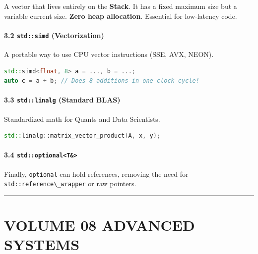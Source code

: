 A vector that lives entirely on the \textbf{Stack}. It has a fixed
maximum size but a variable current size. \textbf{Zero heap allocation}.
Essential for low-latency code.

\hypertarget{stdsimd-vectorization}{%
\paragraph{\texorpdfstring{3.2 \texttt{std::simd}
(Vectorization)}{3.2 std::simd (Vectorization)}}\label{stdsimd-vectorization}}

A portable way to use CPU vector instructions (SSE, AVX, NEON).

\begin{lstlisting}[language={C++}]
std::simd<float, 8> a = ..., b = ...;
auto c = a + b; // Does 8 additions in one clock cycle!
\end{lstlisting}

\hypertarget{stdlinalg-standard-blas}{%
\paragraph{\texorpdfstring{3.3 \texttt{std::linalg} (Standard
BLAS)}{3.3 std::linalg (Standard BLAS)}}\label{stdlinalg-standard-blas}}

Standardized math for Quants and Data Scientists.

\begin{lstlisting}[language={C++}]
std::linalg::matrix_vector_product(A, x, y);
\end{lstlisting}

\hypertarget{stdoptionalt}{%
\paragraph{\texorpdfstring{3.4
\texttt{std::optional\textless{}T\&\textgreater{}}}{3.4 std::optional\textless T\&\textgreater{}}}\label{stdoptionalt}}

Finally, \passthrough{\lstinline!optional!} can hold references,
removing the need for \passthrough{\lstinline!std::reference\_wrapper!}
or raw pointers.

\begin{center}\rule{0.5\linewidth}{0.5pt}\end{center}

\hypertarget{volume-08-advanced-systems}{%
\section{VOLUME 08 ADVANCED SYSTEMS}\label{volume-08-advanced-systems}}
